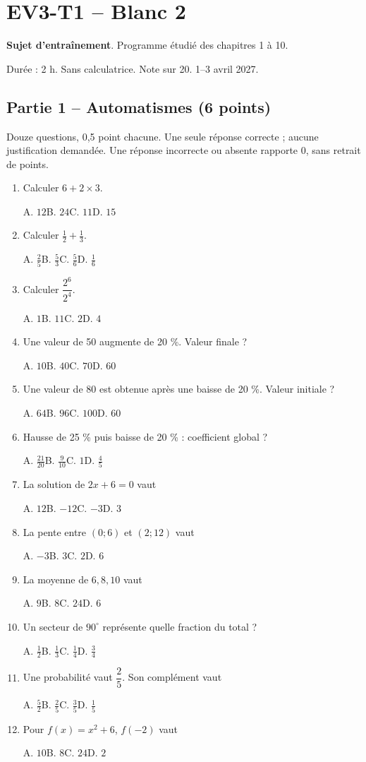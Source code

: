 \clearpage\section*{EV3-T1 -- Blanc 2}\label{EV3-T1}
\textbf{Sujet d’entraînement}. Programme étudié des chapitres 1 à 10.\par Durée : 2 h. Sans calculatrice. Note sur 20. 1–3 avril 2027.
\subsection*{Partie 1 -- Automatismes (6 points)}
Douze questions, 0,5 point chacune. Une seule réponse correcte ; aucune justification demandée. Une réponse incorrecte ou absente rapporte 0, sans retrait de points.
\begin{enumerate}
\item Calculer $6+2\times3$.\par A. $12$\quad B. $24$\quad C. $11$\quad D. $15$
\item Calculer $\frac12+\frac13$.\par A. $\frac{2}{5}$\quad B. $\frac{5}{3}$\quad C. $\frac{5}{6}$\quad D. $\frac{1}{6}$
\item Calculer $\dfrac{2^6}{2^{4}}$.\par A. $1$\quad B. $11$\quad C. $2$\quad D. $4$
\item Une valeur de 50 augmente de 20 \%. Valeur finale ?\par A. $10$\quad B. $40$\quad C. $70$\quad D. $60$
\item Une valeur de 80 est obtenue après une baisse de 20 \%. Valeur initiale ?\par A. $64$\quad B. $96$\quad C. $100$\quad D. $60$
\item Hausse de 25 \% puis baisse de 20 \% : coefficient global ?\par A. $\frac{21}{20}$\quad B. $\frac{9}{10}$\quad C. $1$\quad D. $\frac{4}{5}$
\item La solution de $2x+6=0$ vaut\par A. $12$\quad B. $-12$\quad C. $-3$\quad D. $3$
\item La pente entre $(0;6)$ et $(2;12)$ vaut\par A. $-3$\quad B. $3$\quad C. $2$\quad D. $6$
\item La moyenne de $6, 8, 10$ vaut\par A. $9$\quad B. $8$\quad C. $24$\quad D. $6$
\item Un secteur de $90^\circ$ représente quelle fraction du total ?\par A. $\frac{1}{2}$\quad B. $\frac{1}{3}$\quad C. $\frac{1}{4}$\quad D. $\frac{3}{4}$
\item Une probabilité vaut $\dfrac{2}{5}$. Son complément vaut\par A. $\frac{5}{2}$\quad B. $\frac{2}{5}$\quad C. $\frac{3}{5}$\quad D. $\frac{1}{5}$
\item Pour $f(x)=x^2+6$, $f(-2)$ vaut\par A. $10$\quad B. $8$\quad C. $24$\quad D. $2$
\end{enumerate}
